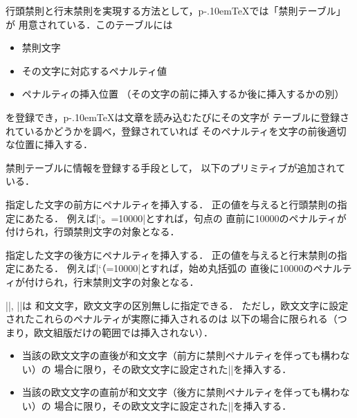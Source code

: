 \documentclass[a4paper,11pt,nomag]{jsarticle}
\def\pTeX{p\kern-.10em\TeX}
\begin{document}
行頭禁則と行末禁則を実現する方法として，\pTeX では「禁則テーブル」が
用意されている．このテーブルには
\begin{itemize}
\item 禁則文字
\item その文字に対応するペナルティ値
\item ペナルティの挿入位置
      （その文字の前に挿入するか後に挿入するかの別）
\end{itemize}
を登録でき，\pTeX は文章を読み込むたびにその文字が
テーブルに登録されているかどうかを調べ，登録されていれば
そのペナルティを文字の前後適切な位置に挿入する．

禁則テーブルに情報を登録する手段として，
以下のプリミティブが追加されている．

\begin{cslist}
\csitem[\.{prebreakpenalty} <character code>=<number>]
  指定した文字の前方にペナルティを挿入する．
  正の値を与えると行頭禁則の指定にあたる．
  例えば|\prebreakpenalty`。=10000|とすれば，句点の
  直前に10000のペナルティが付けられ，行頭禁則文字の対象となる．

\csitem[\.{postbreakpenalty} <character code>=<number>]
  指定した文字の後方にペナルティを挿入する．
  正の値を与えると行末禁則の指定にあたる．
  例えば|\postbreakpenalty`（=10000|とすれば，始め丸括弧の
  直後に10000のペナルティが付けられ，行末禁則文字の対象となる．
\end{cslist}

|\prebreakpenalty|, |\postbreakpenalty|は
和文文字，欧文文字の区別無しに指定できる．
ただし，欧文文字に設定されたこれらのペナルティが実際に挿入されるのは
以下の場合に限られる（つまり，欧文組版だけの範囲では挿入されない）．
\begin{itemize}
  \item 当該の欧文文字の直後が和文文字（前方に禁則ペナルティを伴っても構わない）の
    場合に限り，その欧文文字に設定された|\postbreakpenalty|を挿入する．
  \item 当該の欧文文字の直前が和文文字（後方に禁則ペナルティを伴っても構わない）の
    場合に限り，その欧文文字に設定された|\prebreakpenalty|を挿入する．
\end{itemize}
\iffalse %
\begin{dangerous}
上記の「欧文文字に設定された禁則ペナルティが挿入される状況」は
欧文文字と和文文字の境界であり，
ベースライン補正（\ref{sec:baselineshift}節を参照）を実現する
|disp_node|の挿入箇所でもある．
ベースライン補正がゼロでないとき，|penalty_node|と|disp_node|の
挿入順序は以下のようにしている． %
\begin{itemize}
  \item 欧文→和文文字間： |disp_node| → |penalty_node| (\.{postbreakpenalty}) の順
  \item 和文→欧文文字間： |penalty_node| (\.{prebreakpenalty}) → |disp_node| の順
\end{itemize}
\end{dangerous}
\fi %
\end{document}
